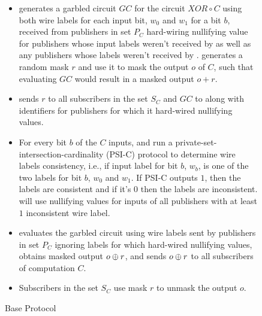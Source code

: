 \begin{figure*}[h]
\begin{mdframed}[style=myframe]
\begin{itemize}[leftmargin=18pt,itemsep=4pt,topsep=4pt]
	\item \garbler generates a garbled circuit $GC$ for the circuit $XOR \circ C$
		using both wire labels for each input bit, $w_0$ and $w_1$ for a bit $b$,
		received from publishers in set $P_C$ hard-wiring nullifying value for
		publishers whose input labels weren't received by \broker as well as any
		publishers whose labels weren't received by \garbler. \garbler generates a
		random mask $r$ and use it to mask the output $o$ of $C$, such that
		evaluating $GC$ would result in a masked output $o+r$.
		
	\item \garbler sends $r$ to all subscribers in the set $S_C$ and $GC$ to
		\broker along with identifiers for publishers for which it hard-wired
		nullifying values.

	\item For every bit $b$ of the $C$ inputs, \garbler and \broker run a
		private-set-intersection-cardinality (PSI-C) protocol to determine wire
		labels consistency, i.e., if \broker input label for bit $b$, $w_b$, is one
		of the two \garbler labels for bit $b$, $w_0$ and $w_1$. If PSI-C outputs
		$1$, then the labels are consistent and if it's $0$ then the labels are
		inconsistent. \garbler will use nullifying values for inputs of all
		publishers with at least $1$ inconsistent wire label. 
		
	\item \broker evaluates the garbled circuit using wire labels sent by
		publishers in set $P_C$ ignoring labels for which \garbler hard-wired
		nullifying values, obtains masked output $o \oplus r$, and sends $o \oplus r$
		to all subscribers of computation $C$.
  
	\item Subscribers in the set $S_C$ use mask $r$ to unmask the output $o$.

\end{itemize}

\end{mdframed}
\caption{Base Protocol}
\label{fig:baseprotocol}
\end{figure*}
